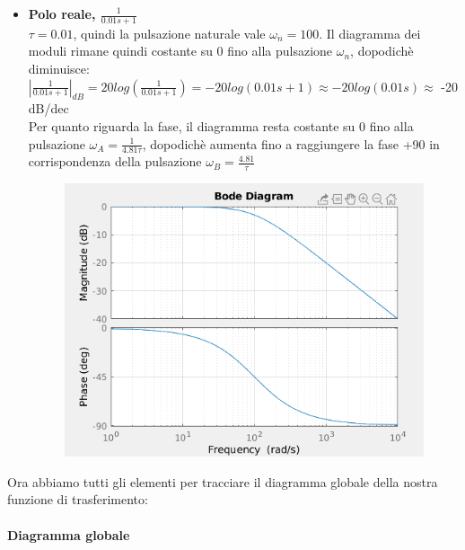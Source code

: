 \documentclass[12pt,a4paper]{article}
\begin{document}
\begin{itemize}
\begin{figure}[h!]
		\end{figure}
		\item \textbf{Polo reale, $\frac{1}{0.01s+1}$}\vspace{5px}\\
		$\tau = 0.01$, quindi la pulsazione naturale vale $\omega_n = 100$. Il diagramma dei moduli rimane quindi costante su 0 fino alla pulsazione $\omega_n$, dopodich\`e diminuisce:\vspace{5px}\\
		$|\frac{1}{0.01s+1}|_{dB} = 20log\left(\frac{1}{0.01s+1}\right) = -20log(0.01s+1) \approx -20log(0.01s)\approx$ -20 dB/dec\vspace{5px}\\Per quanto riguarda la fase, il diagramma resta costante su 0 fino alla pulsazione $\omega_A = \frac{1}{4.81\tau}$, dopodich\`e aumenta fino a raggiungere la fase +90 in corrispondenza della pulsazione $\omega_B = \frac{4.81}{\tau}$
		\begin{figure}[h!]
			\centering
			\includegraphics[scale=0.5]{./images/bode43_5.png}
		\end{figure}
	\end{itemize}
	\newpage
	Ora abbiamo tutti gli elementi per tracciare il diagramma globale della nostra funzione di trasferimento:\\ \\
	\textbf{Diagramma globale}
\end{document}
